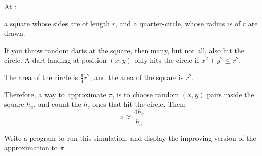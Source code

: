 
At :\\

a square whose sides are of length $r$, and a quarter-circle, whose radius is of $r$ are drawn.


If you throw random darts at the square, then many, but not all, also hit the circle. A dart landing at position $(x,y)$ only hits the circle if $x^2 + y^2 \leq r^2$.

The area of the circle is $\frac{\pi}{4} r^2$, and the area of the square is $r^2$.

Therefore, a way to approximate $\pi$, is to choose random $(x,y)$ pairs inside the square $h_a$, and count the $h_c$ ones that hit the circle. Then:
\begin{equation}
	\pi \approx \frac{4 h_c}{h_a}
\end{equation}

\begin{exercise}
Write a program to run this simulation, and display the improving version of the approximation to $\pi$.
\end{exercise}

